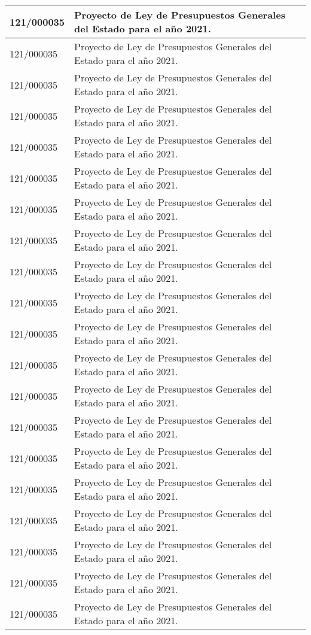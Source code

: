 {\begin{table}[H]
\begin{center}
\begin{tabularx}{\linewidth}{| l | X |}
\hline
121/000035 & Proyecto de Ley de Presupuestos Generales del Estado para el año 2021. \\
\hline
121/000035 & Proyecto de Ley de Presupuestos Generales del Estado para el año 2021. \\
\hline
121/000035 & Proyecto de Ley de Presupuestos Generales del Estado para el año 2021. \\
\hline
121/000035 & Proyecto de Ley de Presupuestos Generales del Estado para el año 2021. \\
\hline
121/000035 & Proyecto de Ley de Presupuestos Generales del Estado para el año 2021. \\
\hline
121/000035 & Proyecto de Ley de Presupuestos Generales del Estado para el año 2021. \\
\hline
121/000035 & Proyecto de Ley de Presupuestos Generales del Estado para el año 2021. \\
\hline
121/000035 & Proyecto de Ley de Presupuestos Generales del Estado para el año 2021. \\
\hline
121/000035 & Proyecto de Ley de Presupuestos Generales del Estado para el año 2021. \\
\hline
121/000035 & Proyecto de Ley de Presupuestos Generales del Estado para el año 2021. \\
\hline
121/000035 & Proyecto de Ley de Presupuestos Generales del Estado para el año 2021. \\
\hline
121/000035 & Proyecto de Ley de Presupuestos Generales del Estado para el año 2021. \\
\hline
121/000035 & Proyecto de Ley de Presupuestos Generales del Estado para el año 2021. \\
\hline
121/000035 & Proyecto de Ley de Presupuestos Generales del Estado para el año 2021. \\
\hline
121/000035 & Proyecto de Ley de Presupuestos Generales del Estado para el año 2021. \\
\hline
121/000035 & Proyecto de Ley de Presupuestos Generales del Estado para el año 2021. \\
\hline
121/000035 & Proyecto de Ley de Presupuestos Generales del Estado para el año 2021. \\
\hline
121/000035 & Proyecto de Ley de Presupuestos Generales del Estado para el año 2021. \\
\hline
121/000035 & Proyecto de Ley de Presupuestos Generales del Estado para el año 2021. \\
\hline
121/000035 & Proyecto de Ley de Presupuestos Generales del Estado para el año 2021. \\

\end{tabularx}
\end{center}
\end{table}}
